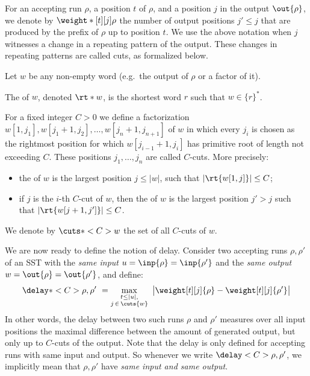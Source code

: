 \documentclass{article}
\providecommand{\AP}{}\NewDocumentCommand{\reintro}{o m}{#2}
\begin{document}
\AP
For an
accepting run $\rho$, a position $t$ of $\rho$, 
and a position $j$ in the output $\out{\rho}$, we denote by
$\weight*[t][j]{\rho}$ %
the number of output positions $j'\le j$ that are produced by 
the prefix of $\rho$ up to position $t$.
We use the above notation when $j$ witnesses
a change in a repeating pattern of the output. These changes in repeating patterns are called cuts, as formalized below.

Let $w$ be any non-empty word (e.g.~the output of $\rho$ or a factor of it).
\AP
The  of $w$, denoted $\rt*{w}$, 
is the shortest word $r$ such that $w \in \{r\}^*$.
\AP
For a fixed integer $C>0$ we define a factorization 
$w[1,j_1],w[j_1+1,j_2],\dots,w[j_n + 1,j_{n+1}]$
of $w$ in which every $j_i$ is chosen as the rightmost 
position for which $w[j_{i-1}+1, j_i]$ has primitive root 
of length not exceeding $C$.
These positions $j_1,\dots,j_n$ are called $C$-cuts.
More precisely:
\begin{itemize}
\item the  of $w$ is the largest position $j\le |w|$, 
      such that $|\rt{w[1,j]}| \le C$;
\item if $j$ is the $i$-th $C$-cut of $w$,
      then the   of $w$ 
      is the largest position $j'>j$ such that 
      $|\rt{w[j+1,j']}| \le C$.
\end{itemize}
\AP
We denote by $\cuts*<C>{w}$ 
the set of all $C$-cuts of $w$.

\AP
We are now ready to define the notion of delay.
Consider two accepting runs $\rho,\rho'$ of an SST 
with the \emph{same input} $u=\inp{\rho}=\inp{\rho'}$ and the 
\emph{same output} $w=\out{\rho}=\out{\rho'}$,
and define:
\[
  \delay*<C>{\rho,\rho'} ~= 
  \max\limits_{\substack{t\le |u|, \\ j\,\in\,\cuts{w}}} ~ 
  \big| \weight[t][j]{\rho} - \weight[t][j]{\rho'} \big|
\]
In other words, the delay between two such runs $\rho$ and $\rho'$ measures over all input positions the maximal difference between the amount of generated output, but only up to $C$-cuts  of the output.
Note that the delay is only defined for accepting runs with 
same input and output. 
So whenever we write $\delay<C>{\rho,\rho'}$, we implicitly mean 
that $\rho,\rho'$ have \emph{same input and same output}.
\end{document}
